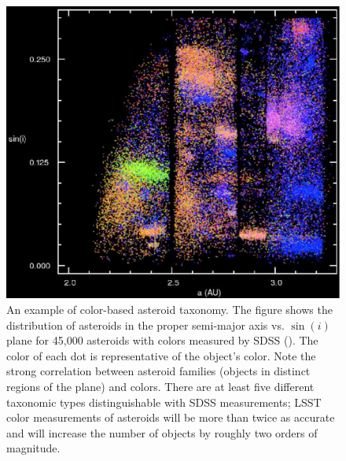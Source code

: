 \begin{figure}
\includegraphics[width=1.0\hsize,clip]{asteroids.pdf}
\caption{An example of color-based asteroid taxonomy. The figure
shows the distribution of asteroids in the proper semi-major axis vs. $\sin(i)$
plane for 45,000 asteroids with colors measured by SDSS (\cite{Parker2008}).
The color of each dot is representative of the object's color.
Note the strong correlation between asteroid families (objects in distinct regions
of the plane) and colors. There are
at least five different taxonomic types distinguishable with SDSS measurements;
LSST color measurements of asteroids will be more than twice as accurate
and will increase the number of objects by roughly two orders of magnitude.}
\label{Fig:asteroids}
\end{figure}

